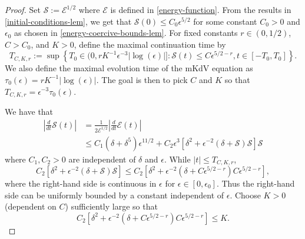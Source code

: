 \begin{proof}
	
	Set \(\mathcal S := \mathcal E ^{1/2}\) where \(\mathcal E\) is defined in \cref{energy-function}. From the results in \cref{initial-conditions-lem}, we get that \(\mathcal S(0) \leq C_0 \epsilon^{5/2}\) for some constant \(C_0 > 0\) and \(\epsilon_0\) as chosen in \cref{energy-coercive-bounds-lem}. For fixed constants \(r\in(0,1/2)\), \(C> C_0\), and \(K > 0\), define the maximal continuation time by 
	\begin{equation}
		T_{C,K,r} := \sup \left\{T_0 \in (0, r K^{-1} \epsilon^{-3} |\log(\epsilon)|]: \mathcal S(t) \leq C \epsilon^{5/2 -r}, t\in [-T_0, T_0]\right\}.
	\end{equation} 
	We also define the maximal evolution time of the mKdV equation as \(\tau_0(\epsilon) = rK^{-1}|\log(\epsilon)|\). The goal is then to pick \(C\) and \(K\) so that \(T_{C,K,r} = \epsilon^{-3} \tau_0(\epsilon)\).
	
	We have that
	\begin{equation}
	\begin{aligned}
		\left | \frac d {dt} \mathcal S(t) \right | &= \frac 1 {2 \mathcal E ^{1/2}} \left | \frac d {dt} \mathcal E(t) \right| \\
		&\leq C_1(\delta + \delta^5) \epsilon^{11/2} + C_2 \epsilon^3\left[ \delta^2 + \epsilon^{-2}(\delta + \mathcal S) \mathcal S \right]\mathcal S
	\end{aligned}
	\end{equation}
	where \(C_1, C_2 > 0\) are independent of \(\delta\) and \(\epsilon\). While \(|t| \leq T_{C,K,r}\),
	\begin{equation}
		C_2 \left[ \delta^2 + \epsilon^{-2}(\delta + \mathcal S) \mathcal S \right] \leq C_2 \left[ \delta^2  + \epsilon^{-2}(\delta +  C\epsilon^{5/2-r}) C \epsilon^{5/2-r} \right],
	\end{equation}
	where the right-hand side is continuous in \(\epsilon \) for \(\epsilon \in [0,\epsilon_0]\). Thus the right-hand side can be uniformly bounded by a constant independent of \(\epsilon\). Choose \(K>0\) (dependent on \(C\)) sufficiently large so that 
	\begin{equation}\label{K-def}
		C_2 \left[ \delta^2  + \epsilon^{-2}(\delta +  C\epsilon^{5/2-r}) C \epsilon^{5/2-r} \right] \leq K.
	\end{equation}


\end{proof}

